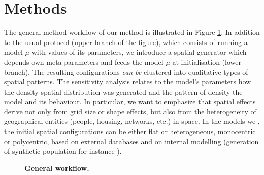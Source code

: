 \documentclass[3p,times,procedia]{elsarticle}
\begin{document}
\section{Methods}

The general method workflow of our method is illustrated in Figure \ref{fig:method}. In addition to the usual protocol (upper branch of the figure), which consists of running a model $\mu$ with  values of its parameters, we introduce a spatial generator which depends  own meta-parameters and feeds the model $\mu$ at initialisation (lower branch). The resulting configurations \emph{can be} clustered into qualitative types of spatial patterns. The sensitivity analysis relates to the model's parameters  how the density spatial distribution was generated and the pattern of density  the model and its behaviour. In particular, we want to emphasize that spatial effects  derive not only from grid size or shape effects, but also from the heterogeneity of  geographical entities (people, housing, networks, etc.) in  space. In the models we , the initial spatial configurations  can be either flat or heterogeneous, monocentric or polycentric, based on external databases and on internal modelling (generation of synthetic population for instance \citep{bhat1999activity}).
\begin{figure}[htbp] 
\begin{center} 
 \caption{\textbf{General workflow.}} \label{fig:method}
\end{center}
\end{figure} %
\end{document}
